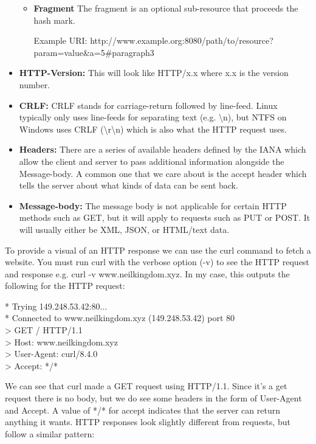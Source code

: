 \documentclass{article}
\begin{document}
\begin{itemize}
{\begin{itemize}
   \item{%
      \textbf{Fragment} The fragment is an optional sub-resource that proceeds the hash mark.
   }

   Example URI: http://www.example.org:8080/path/to/resource?param=value\&a=5\#paragraph3

   \end{itemize}
}

\item{%
   \textbf{HTTP-Version:} This will look like HTTP/x.x where x.x is the version number.
}

\item{%
   \textbf{CRLF:} CRLF stands for carriage-return followed by line-feed. Linux typically only uses
   line-feeds for separating text (e.g. \textbackslash{}n), but NTFS on Windows uses CRLF
   (\textbackslash{}r\textbackslash{}n) which is also what the HTTP request uses.
}

\item{%
   \textbf{Headers:} There are a series of available headers defined by the IANA which allow the
   client and server to pass additional information alongside the Message-body. A common one that we care
   about is the accept header which tells the server about what kinds of data can be sent back.
}

\item{%
   \textbf{Message-body:} The message body is not applicable for certain HTTP methods such as GET,
   but it will apply to requests such as PUT or POST. It will usually either be XML, JSON, or HTML/text data.
}

\end{itemize}

To provide a visual of an HTTP response we can use the curl command to fetch a website. You must run curl with
the verbose option (-v) to see the HTTP request and response e.g. curl -v www.neilkingdom.xyz. In my case,
this outputs the following for the HTTP request:

*   Trying 149.248.53.42:80...\\
* Connected to www.neilkingdom.xyz (149.248.53.42) port 80\\
> GET / HTTP/1.1\\
> Host: www.neilkingdom.xyz\\
> User-Agent: curl/8.4.0\\
> Accept: */*

We can see that curl made a GET request using HTTP/1.1. Since it's a get request there is no body, but we do
see some headers in the form of User-Agent and Accept. A value of */* for accept indicates that the server can
return anything it wants. HTTP responses look slightly different from requests, but follow a similar pattern:
\end{document}
